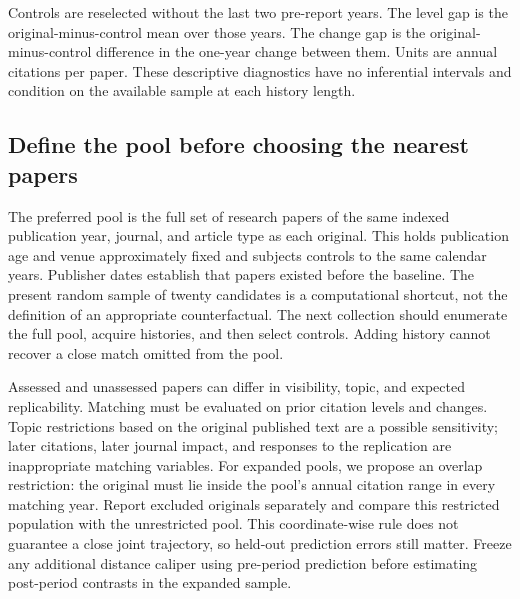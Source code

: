 \begin{table}[H]
\centering
\caption{Prediction of pre-report citations outside the matching period.}
\label{tab:validation}
\small

\par\smallskip\begin{minipage}{\linewidth}\footnotesize
Controls are reselected without the last two pre-report years. The level gap is the original-minus-control mean over those years. The change gap is the original-minus-control difference in the one-year change between them. Units are annual citations per paper. These descriptive diagnostics have no inferential intervals and condition on the available sample at each history length.
\end{minipage}
\end{table}

\subsection{Define the pool before choosing the nearest papers}
The preferred pool is the full set of research papers of the same indexed publication year, journal, and article type as each original. This holds publication age and venue approximately fixed and subjects controls to the same calendar years. Publisher dates establish that papers existed before the baseline. The present random sample of twenty candidates is a computational shortcut, not the definition of an appropriate counterfactual. The next collection should enumerate the full pool, acquire histories, and then select controls. Adding history cannot recover a close match omitted from the pool.

Assessed and unassessed papers can differ in visibility, topic, and expected replicability. Matching must be evaluated on prior citation levels and changes. Topic restrictions based on the original published text are a possible sensitivity; later citations, later journal impact, and responses to the replication are inappropriate matching variables. For expanded pools, we propose an overlap restriction: the original must lie inside the pool's annual citation range in every matching year. Report excluded originals separately and compare this restricted population with the unrestricted pool. This coordinate-wise rule does not guarantee a close joint trajectory, so held-out prediction errors still matter. Freeze any additional distance caliper using pre-period prediction before estimating post-period contrasts in the expanded sample.

